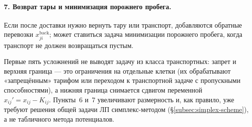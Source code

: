 \paragraph{7. Возврат тары и минимизация порожнего пробега.}
Если после доставки нужно вернуть тару или транспорт, добавляются обратные
перевозки $x_{ji}^{\text{back}}$; может ставиться задача минимизации порожнего
пробега, когда транспорт не должен возвращаться пустым.

\begin{idea}
Первые пять усложнений не выводят задачу из класса транспортных: запрет и
верхняя граница — это ограничения на отдельные клетки (их обрабатывают
«запрещённым» тарифом или переходом к транспортной задаче с пропускными
способностями), а нижняя граница снимается сдвигом переменной
$x_{ij}' = x_{ij} - K_{ij}$. Пункты~6 и~7 увеличивают размерность и, как
правило, уже требуют решения общей задачи ЛП симплекс-методом
(\S\ref{subsec:simplex-scheme}), а не табличного метода потенциалов.
\end{idea}
